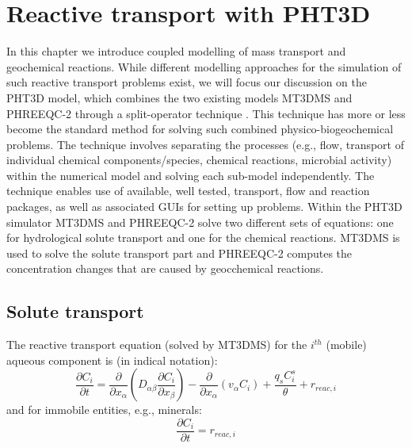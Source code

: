 \chapter[Reactive transport with PHT3D]{Reactive transport with PHT3D}
\def\shorttitle{Reactive transport with PHT3D} %

In this chapter we introduce coupled modelling of mass transport and geochemical reactions.
While different modelling approaches for the simulation of such reactive transport 
problems exist, we will focus our discussion on the PHT3D model, which
combines the two existing models MT3DMS and PHREEQC-2 through 
a split-operator technique \citep[]{herzer89,phdzysset}.
This technique has more or less become the standard method for solving such combined
physico-biogeochemical problems. The technique involves separating
the processes (e.g., flow, transport of individual chemical
components/species, chemical reactions, microbial activity) within
the numerical model and solving each sub-model independently. The
technique enables use of available, well tested, transport, flow
and reaction packages, as well as associated GUIs for setting up
problems. Within the PHT3D simulator MT3DMS and PHREEQC-2 solve two 
different sets of equations: one for hydrological solute transport and 
one for the chemical reactions. MT3DMS is used to solve the solute 
transport part and PHREEQC-2 computes the concentration changes
that are caused by geocchemical reactions. 

\section{Solute transport}

The reactive transport equation (solved by MT3DMS) for the
$i^{th}$ (mobile) aqueous component is (in indical notation):
\begin{equation}
{\frac{\partial C_i} {\partial t} = \frac{\partial} {\partial
x_{\alpha}}
 (D_{\alpha\beta} \frac{\partial C_i} {\partial x_{\beta}}) -
 \frac{\partial} {\partial x_{\alpha}} (v_{\alpha} C_i) + \frac{q_s C^s_i}{\theta} + r_{reac,i}}
\label{eq:ad_reac_mobile}
\end{equation}
and for immobile entities, e.g., minerals:
\begin{equation}
{\frac{\partial C_i} {\partial t} = r_{reac,i}}
\label{eq:ad_reac_immobile}
\end{equation}

